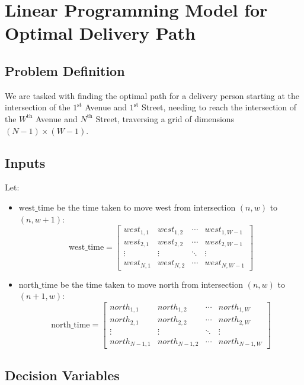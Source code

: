 \documentclass{article}
\begin{document}
\section*{Linear Programming Model for Optimal Delivery Path}

\subsection*{Problem Definition}

We are tasked with finding the optimal path for a delivery person starting at the intersection of the \(1^{\text{st}}\) Avenue and \(1^{\text{st}}\) Street, needing to reach the intersection of the \(W^{\text{th}}\) Avenue and \(N^{\text{th}}\) Street, traversing a grid of dimensions \((N-1) \times (W-1)\).

\subsection*{Inputs}

Let:
\begin{itemize}
    \item \( \text{west\_time} \) be the time taken to move west from intersection \((n, w)\) to \((n, w+1)\):
    \[
    \text{west\_time} = \begin{bmatrix}
    west_{1,1} & west_{1,2} & \cdots & west_{1,W-1} \\
    west_{2,1} & west_{2,2} & \cdots & west_{2,W-1} \\
    \vdots & \vdots & \ddots & \vdots \\
    west_{N,1} & west_{N,2} & \cdots & west_{N,W-1}
    \end{bmatrix}
    \]

    \item \( \text{north\_time} \) be the time taken to move north from intersection \((n, w)\) to \((n+1, w)\):
    \[
    \text{north\_time} = \begin{bmatrix}
    north_{1,1} & north_{1,2} & \cdots & north_{1,W} \\
    north_{2,1} & north_{2,2} & \cdots & north_{2,W} \\
    \vdots & \vdots & \ddots & \vdots \\
    north_{N-1,1} & north_{N-1,2} & \cdots & north_{N-1,W}
    \end{bmatrix}
    \]
\end{itemize}

\subsection*{Decision Variables}
\end{document}
